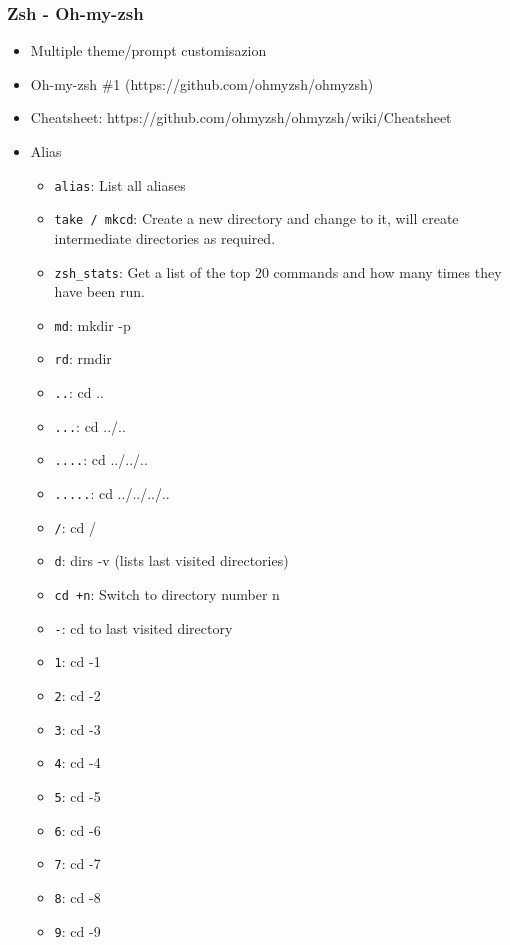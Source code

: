 \subsubsection{Zsh - Oh-my-zsh}
\begin{frame}[fragile]{\subsubsecname}
  \begin{itemize}
    \item Multiple theme/prompt customisazion
    \item Oh-my-zsh \#1 (https://github.com/ohmyzsh/ohmyzsh)
    \item Cheatsheet: https://github.com/ohmyzsh/ohmyzsh/wiki/Cheatsheet
    \item Alias
    \begin{itemize}
      \item \texttt{alias}:	List all aliases
      \item \texttt{take / mkcd}:	Create a new directory and change to it, will create intermediate directories as required.
      \item \texttt{zsh\_stats}:	Get a list of the top 20 commands and how many times they have been run.
      \item \texttt{md}: mkdir -p
      \item \texttt{rd}: rmdir
      \item \texttt{..}: cd ..
      \item \texttt{...}: cd ../..
      \item \texttt{....}: cd ../../..
      \item \texttt{.....}: cd ../../../..
      \item \texttt{/}: cd /
      \item \texttt{d}: dirs -v (lists last visited directories)
      \item \texttt{cd +n}: Switch to directory number n
      \item \texttt{-}: cd to last visited directory
      \item \texttt{1}: cd -1
      \item \texttt{2}: cd -2
      \item \texttt{3}: cd -3
      \item \texttt{4}: cd -4
      \item \texttt{5}: cd -5
      \item \texttt{6}: cd -6
      \item \texttt{7}: cd -7
      \item \texttt{8}: cd -8
      \item \texttt{9}: cd -9
    \end{itemize}
  \end{itemize}
\end{frame}
